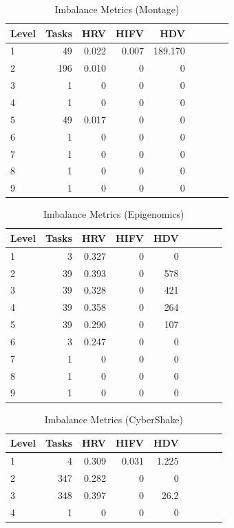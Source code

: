 \begin{table}[!htb]
\caption{Imbalance Metrics (Montage)}
\label{tab:evaluation_montage}
\centering
\begin{tabular}{lrrrrrrrr}
\hline
Level & Tasks & HRV &  HIFV & HDV  \\

\hline
1 &49 & 0.022 & 0.007 & 189.170 \\
2 & 196 & 0.010 & 0 & 0\\
3 & 1 & 0 & 0 & 0\\
4 & 1 & 0 & 0 & 0\\
5 &49 & 0.017 & 0 & 0\\
6 & 1 & 0 & 0 & 0 \\
7 &1  & 0 & 0 & 0\\
8 &1 & 0 & 0 & 0\\
9 & 1 & 0 & 0 & 0\\
\hline
\end{tabular}
\end{table} 

\begin{table}[!htb]
\caption{Imbalance Metrics (Epigenomics)}
\label{tab:evaluation_genome}
\centering
\begin{tabular}{lrrrrrrrr}
\hline
Level & Tasks & HRV &  HIFV & HDV  \\

\hline
1 & 3 & 0.327 & 0 & 0 \\
2 & 39 & 0.393 & 0 & 578\\
3 & 39 & 0.328 & 0 & 421\\
4 & 39 & 0.358 & 0 & 264\\
5 &39 & 0.290 & 0 & 107\\
6 & 3 & 0.247 & 0 & 0 \\
7 &1  & 0 & 0 & 0\\
8 &1 & 0 & 0 & 0\\
9 & 1 & 0 & 0 & 0\\
\hline
\end{tabular}
\end{table} 

\begin{table}[!htb]
\caption{Imbalance Metrics (CyberShake)}
\label{tab:evaluation_cybershake}
\centering
\begin{tabular}{lrrrrrrrr}
\hline
Level & Tasks & HRV &  HIFV & HDV  \\

\hline
1 & 4 & 0.309 & 0.031 & 1.225 \\
2 & 347 & 0.282 & 0 & 0\\
3 & 348 & 0.397 & 0 & 26.2\\
4 & 1 & 0 & 0 & 0 \\

\hline
\end{tabular}
\end{table} 


